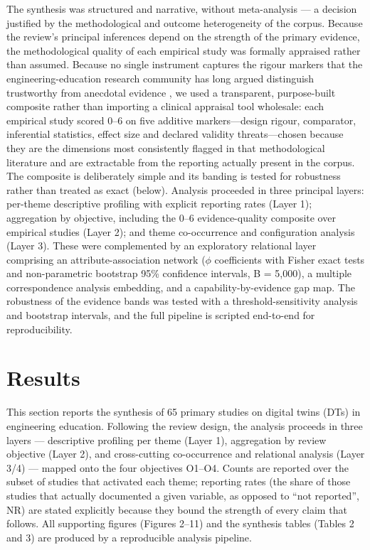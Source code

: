 The synthesis was structured and narrative, without meta-analysis --- a decision
justified by the methodological and outcome heterogeneity of the corpus. Because
the review's principal inferences depend on the strength of the primary evidence,
the methodological quality of each empirical study was formally appraised rather
than assumed. Because no single instrument captures the rigour markers that the
engineering-education research community has long argued distinguish trustworthy
from anecdotal evidence \cite{streveler_conducting_2006}, we used a transparent,
purpose-built composite rather than importing a clinical appraisal tool wholesale:
each empirical study scored 0--6 on five additive markers---design rigour,
comparator, inferential statistics, effect size and declared validity
threats---chosen because they are the dimensions most consistently flagged in that
methodological literature and are extractable from the reporting actually present
in the corpus. The composite is deliberately simple and its banding is tested for
robustness rather than treated as exact (below). Analysis proceeded in three
principal layers: per-theme descriptive profiling with explicit
reporting rates (Layer 1); aggregation by objective, including the 0--6
evidence-quality composite over empirical studies
(Layer 2); and theme co-occurrence and configuration analysis (Layer 3). These
were complemented by an exploratory relational layer comprising an
attribute-association network (\ensuremath{\phi} coefficients with Fisher exact tests and
non-parametric bootstrap 95\% confidence intervals, B = 5,000), a multiple
correspondence analysis embedding, and a capability-by-evidence gap map. The
robustness of the evidence bands was tested with a threshold-sensitivity analysis
and bootstrap intervals, and the full pipeline is scripted end-to-end for
reproducibility.

\section{Results}\label{results}

This section reports the synthesis of 65 primary studies on digital twins (DTs)
in engineering education. Following the review design, the analysis proceeds in
three layers --- descriptive profiling per theme (Layer 1), aggregation by review
objective (Layer 2), and cross-cutting co-occurrence and relational analysis
(Layer 3/4) --- mapped onto the four objectives O1--O4. Counts are reported over
the subset of studies that activated each theme; reporting rates (the share of
those studies that actually documented a given variable, as opposed to ``not
reported'', NR) are stated explicitly because they bound the strength of every
claim that follows. All supporting figures (Figures 2--11) and the
synthesis tables (Tables 2 and 3) are produced by a reproducible analysis pipeline.

